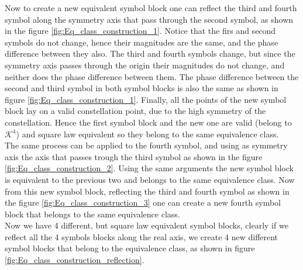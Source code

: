 Now to create a new equivalent symbol block one can reflect the third and fourth symbol along the symmetry axis that pass through the second symbol, as shown in the figure \ref{fig:Eq_class_construction_1}. Notice that the firs and second symbols do not change, hence their magnitudes are the same, and the phase difference between they also. The third and fourth symbols change, but since the symmetry axis passes through the origin their magnitudes do not change, and neither does the phase difference between them. The phase difference between the second and third symbol in both symbol blocks is also the same as shown in figure \ref{fig:Eq_class_construction_1}. Finally, all the points of the new symbol block lay on a valid constellation point, due to the high symmetry of the constellation. Hence the first symbol block and the new one are valid (belong to $\mathcal K^4$) and square law equivalent so they belong to the same equivalence class.\\

The same process can be applied to the fourth symbol, and using as symmetry axis the axis that passes trough the third symbol as shown in the figure \ref{fig:Eq_class_construction_2}. Using the same arguments the new symbol block is equivalent to the previous two and belongs to the same equivalence class. Now from this new symbol block, reflecting the third and fourth symbol as shown in the figure \ref{fig:Eq_class_construction_3} one can create a new fourth symbol block that belongs to the same equivalence class.\\

Now we have 4 different, but square law equivalent symbol blocks, clearly if we reflect all the 4 symbols blocks along the real axis, we create 4 new different symbol blocks that belong to the equivalence class, as shown in figure \ref{fig:Eq_class_construction_reflection}.\\

